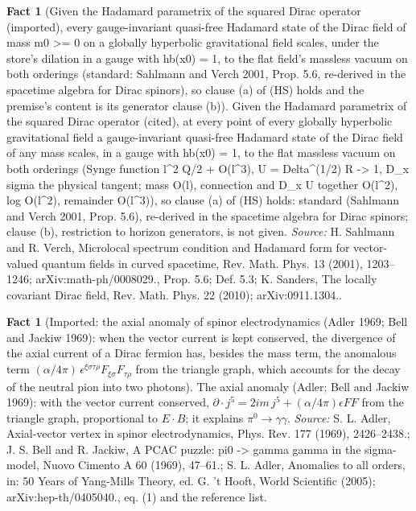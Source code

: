 \documentclass[11pt]{article}
\theoremstyle{definition}
\newtheorem{fact}[theorem]{Fact}
\theoremstyle{plain}
\begin{document}
\begin{fact}[Given the Hadamard parametrix of the squared Dirac operator (imported), every gauge-invariant quasi-free Hadamard state of the Dirac field of mass m0 >= 0 on a globally hyperbolic gravitational field scales, under the store's dilation in a gauge with hb(x0) = 1, to the flat field's massless vacuum on both orderings (standard: Sahlmann and Verch 2001, Prop. 5.6, re-derived in the spacetime algebra for Dirac spinors), so clause (a) of (HS) holds and the premise's content is its generator clause (b)]\label{c:synthesis.hadamard-dirac-states-scale-to-the-flat-massless-vacuum-at-every-point-of-a-gravitational-field}
Given the Hadamard parametrix of the squared Dirac operator (cited), at every point of every globally hyperbolic gravitational field a gauge-invariant quasi-free Hadamard state of the Dirac field of any mass scales, in a gauge with hb(x0) = 1, to the flat massless vacuum on both orderings (Synge function l^2 Q/2 + O(l^3), U = Delta^(1/2) R -> 1, D_x sigma the physical tangent; mass O(l), connection and D_x U together O(l^2), log O(l^2), remainder O(l^3)), so clause (a) of (HS) holds: standard (Sahlmann and Verch 2001, Prop. 5.6), re-derived in the spacetime algebra for Dirac spinors; clause (b), restriction to horizon generators, is not given.
\emph{Source:} H. Sahlmann and R. Verch, Microlocal spectrum condition and Hadamard form for vector-valued quantum fields in curved spacetime, Rev. Math. Phys. 13 (2001), 1203--1246; arXiv:math-ph/0008029., Prop. 5.6; Def. 5.3; K. Sanders, The locally covariant Dirac field, Rev. Math. Phys. 22 (2010); arXiv:0911.1304..
\end{fact}

\begin{fact}[Imported: the axial anomaly of spinor electrodynamics (Adler 1969; Bell and Jackiw 1969): when the vector current is kept conserved, the divergence of the axial current of a Dirac fermion has, besides the mass term, the anomalous term $(\alpha/4\pi)\,\epsilon^{\xi\sigma\tau\rho}F_{\xi\sigma}F_{\tau\rho}$ from the triangle graph, which accounts for the decay of the neutral pion into two photons]\label{c:synthesis.imported-adler-bell-jackiw-axial-anomaly}
The axial anomaly (Adler; Bell and Jackiw 1969): with the vector current conserved, $\partial\cdot j^{5} = 2im\,j^{5} + (\alpha/4\pi)\epsilon FF$ from the triangle graph, proportional to $E\cdot B$; it explains $\pi^{0} \to \gamma\gamma$.
\emph{Source:} S. L. Adler, Axial-vector vertex in spinor electrodynamics, Phys. Rev. 177 (1969), 2426--2438.; J. S. Bell and R. Jackiw, A PCAC puzzle: pi0 -> gamma gamma in the sigma-model, Nuovo Cimento A 60 (1969), 47--61.; S. L. Adler, Anomalies to all orders, in: 50 Years of Yang-Mills Theory, ed. G. 't Hooft, World Scientific (2005); arXiv:hep-th/0405040., eq. (1) and the reference list.
\end{fact}
\end{document}
